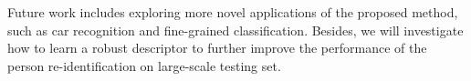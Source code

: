 \documentclass[journal]{IEEEtran}
\begin{document}
Future work includes exploring more novel applications of the proposed method, such as car recognition and fine-grained classification. Besides, we will investigate how to learn a robust descriptor to further improve the performance of the person re-identification on large-scale testing set.











\ifCLASSOPTIONcaptionsoff
  \newpage
\fi













\vfill
\end{document}
